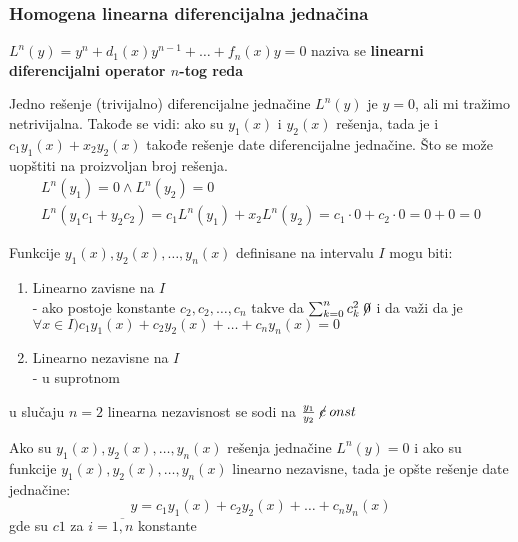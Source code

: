 \subsubsection{Homogena linearna diferencijalna jednačina}
	\begin{definition}
		$L^{n}(y) = y^{n} + d_1(x)y^{n-1} + \ldots + f_n(x)y = 0$ naziva se \textbf{linearni diferencijalni operator $n$-tog reda}
	\end{definition}
	Jedno rešenje (trivijalno) diferencijalne jednačine $L^{n}(y)$ je $y=0$, ali mi tražimo netrivijalna. Takođe se vidi: ako su $y_1(x)$ i $y_2(x)$ rešenja, tada je i $c_1y_1(x) + x_2 y_2(x)$ takođe rešenje date diferencijalne jednačine. Što se može uopštiti na proizvoljan broj rešenja. 
	\begin{gather}
		L^n (y_1) = 0 \land L^n(y_2) = 0\\
		L^n (y_1c_1 + y_2c_2) = c_1L^n(y_1) + x_2 L^n(y_2) = c_1\cdot 0 + c_2\cdot 0= 0+0 = 0
	\end{gather}
	\begin{definition}
		Funkcije $y_1(x), y_2(x), \ldots, y_n(x)$ definisane na intervalu $I$ mogu biti:
		\begin{enumerate}[label = \arabic*.)]
			\item 
				Linearno zavisne na $I$\\
				- ako postoje konstante $c_2, c_2, \ldots, c_n$ takve da $\sum_{k=0}^{n}c_k^2 \centernot 0 $ i da važi da je $\forall x \in I) c_1y_1(x) + c_2y_2(x) + \ldots + c_ny_n(x) = 0$
			\item 
				Linearno nezavisne na $I$\\
				- u suprotnom
		\end{enumerate}
	\Napomena u slučaju $n=2$ linearna nezavisnost se sodi na $\frac{y_1}{y_2} \centernot const$
	\end{definition}
	\begin{theorem}
		Ako su  $y_1(x), y_2(x), \ldots, y_n(x)$ rešenja jednačine $L^n(y) = 0$ i ako su funkcije  $y_1(x), y_2(x), \ldots, y_n(x)$ linearno nezavisne, tada je opšte rešenje date jednačine:
		$$ y =c_1y_1(x) + c_2y_2(x) + \ldots + c_ny_n(x) $$
		gde su $c1$ za $i = \overline{1, n}$ konstante
	\end{theorem}

